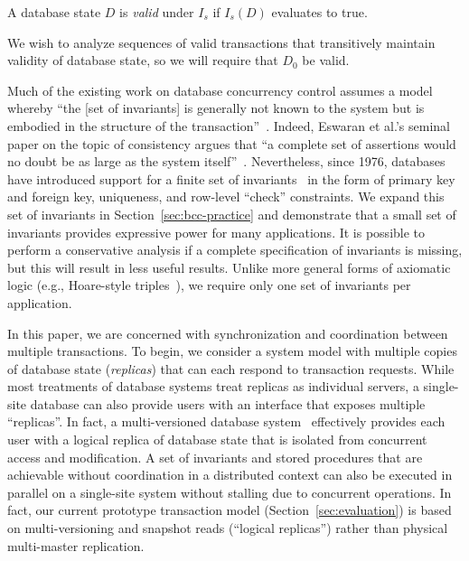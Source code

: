 \begin{definition}
A database state $D$ is \textit{valid} under $I_s$ if $I_s(D)$
evaluates to true.
\end{definition}

We wish to analyze sequences of valid transactions that transitively
maintain validity of database state, so we will require that $D_0$ be
valid. 

 Much of the existing work on
database concurrency control assumes a model whereby ``the [set of
  invariants] is generally not known to the system but is embodied in
the structure of the transaction''~\cite{traiger-tods}. Indeed,
Eswaran et al.'s seminal paper on the topic of consistency argues that
``a complete set of assertions would no doubt be as large as the
system itself''~\cite{eswaran-consistency}. Nevertheless, since 1976,
databases have introduced support for a finite set of
invariants~\cite{korth-serializability} in the form of primary key and
foreign key, uniqueness, and row-level ``check'' constraints. We
expand this set of invariants in Section~\ref{sec:bcc-practice} and
demonstrate that a small set of invariants provides expressive power
for many applications. It is possible to perform a conservative
analysis if a complete specification of invariants is missing, but
this will result in less useful results. Unlike more general forms of
axiomatic logic (e.g., Hoare-style triples~\cite{decomp-semantics}),
we require only one set of invariants per application.\vspace{.5em}

 In this paper, we are concerned with
synchronization and coordination between multiple transactions. To
begin, we consider a system model with multiple copies of database
state (\textit{replicas}) that can each respond to transaction
requests. While most treatments of database systems treat replicas as
individual servers, a single-site database can also provide users with
an interface that exposes multiple ``replicas''. In fact, a
multi-versioned database system~\cite{bernstein-book} effectively
provides each user with a logical replica of database state that is
isolated from concurrent access and modification. A set of invariants
and stored procedures that are achievable without coordination in a
distributed context can also be executed in parallel on a single-site
system without stalling due to concurrent operations.  In fact, our
current prototype transaction model (Section~\ref{sec:evaluation}) is
based on multi-versioning and snapshot reads (``logical replicas'')
rather than physical multi-master replication.

